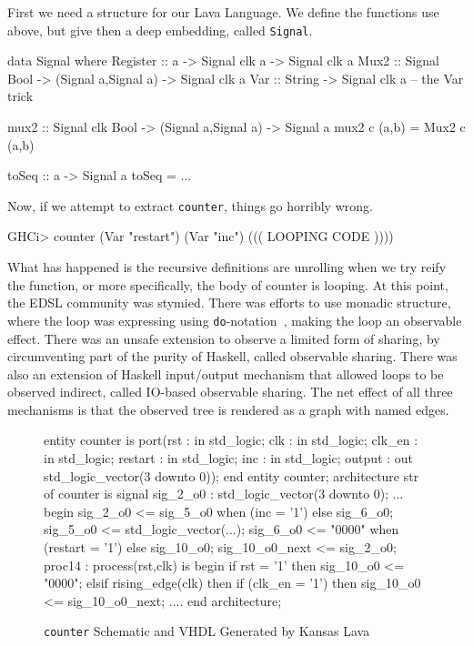 \documentclass[11pt]{article}
\begin{document}
First we need a structure for our Lava Language. We define the
functions use above, but give then a deep embedding, called \verb|Signal|.
\begin{Code}
        
data Signal where
  Register :: a -> Signal clk a                  -> Signal clk a
  Mux2     :: Signal Bool -> (Signal a,Signal a) -> Signal clk a
  Var      :: String                             -> Signal clk a -- the Var trick

mux2 :: Signal clk Bool -> (Signal a,Signal a) -> Signal a
mux2 c (a,b) = Mux2 c (a,b)

toSeq :: a -> Signal a
toSeq = ...

\end{Code}
Now, if we attempt to extract \verb|counter|, things go horribly wrong.
\begin{Code}
GHCi> counter (Var "restart") (Var "inc")
((( LOOPING CODE ))))
\end{Code}        
What has happened is the recursive definitions are unrolling when we try reify the function,
or more specifically, the body of counter is looping. At this point, the EDSL community was
stymied. There was efforts to use monadic structure, where the loop was expressing using
\verb|do|-notation~\cite{...}, making the loop an observable effect. There was an unsafe
extension to observe a limited form of sharing, by circumventing part of the purity of Haskell,
called observable sharing.
There was also an extension of Haskell input/output mechanism that allowed loops to
be observed indirect, called IO-based observable sharing. The net effect of all three
mechanisms is that the observed tree is rendered as a graph with named edges.

\begin{figure}[!t]
  \centering
   \begin{minipage}{0.5\textwidth}
     \centering
\footnotesize\begin{Code}[fontsize=\tiny]
entity counter is
  port(rst : in std_logic;
       clk : in std_logic;
       clk_en : in std_logic;
       restart : in std_logic;
       inc : in std_logic;
       output : out std_logic_vector(3 downto 0));
end entity counter;
architecture str of counter is
  signal sig_2_o0 : std_logic_vector(3 downto 0);
  ...
begin
  sig_2_o0 <= sig_5_o0 when (inc = '1')  else sig_6_o0;
  sig_5_o0 <= std_logic_vector(...);
  sig_6_o0 <= "0000" when (restart = '1') else sig_10_o0;
  sig_10_o0_next <= sig_2_o0;
  proc14 : process(rst,clk) is
  begin
    if rst = '1' then
      sig_10_o0 <= "0000";
    elsif rising_edge(clk) then
      if (clk_en = '1') then
        sig_10_o0 <= sig_10_o0_next;
  ....
end architecture;
\end{Code}
  \end{minipage}
  \caption{{\tt counter} Schematic and VHDL Generated by Kansas Lava}
  \label{fig:counter-pictureX}
\end{figure}
\end{document}
